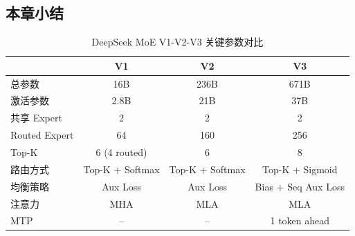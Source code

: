 \subsection{本章小结}

\begin{table}[H]
\centering
\begin{tabular}{lccc}
\toprule
& \textbf{V1} & \textbf{V2} & \textbf{V3} \\
\midrule
总参数 & 16B & 236B & 671B \\
激活参数 & 2.8B & 21B & 37B \\
共享 Expert & 2 & 2 & 2 \\
Routed Expert & 64 & 160 & 256 \\
Top-K & 6 (4 routed) & 6 & 8 \\
路由方式 & Top-K + Softmax & Top-K + Softmax & Top-K + Sigmoid \\
均衡策略 & Aux Loss & Aux Loss & Bias + Seq Aux Loss \\
注意力 & MHA & MLA & MLA \\
MTP & -- & -- & 1 token ahead \\
\bottomrule
\end{tabular}
\caption{DeepSeek MoE V1-V2-V3 关键参数对比}
\end{table}



